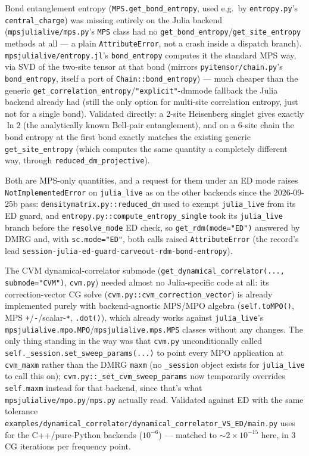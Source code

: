 \documentclass[11pt]{article}
\begin{document}
Bond entanglement entropy (\texttt{MPS.get\_bond\_entropy}, used e.g.\ by
\texttt{entropy.py}'s \texttt{central\_charge}) was missing entirely on
the Julia backend (\texttt{mpsjulialive/mps.py}'s \texttt{MPS} class had
no \texttt{get\_bond\_entropy}/\texttt{get\_site\_entropy} methods at
all --- a plain \texttt{AttributeError}, not a crash inside a dispatch
branch). \texttt{mpsjulialive/entropy.jl}'s \texttt{bond\_entropy}
computes it the standard MPS way, via SVD of the two-site tensor at that
bond (mirrors \texttt{pyitensor/chain.py}'s \texttt{bond\_entropy},
itself a port of \texttt{Chain::bond\_entropy}) --- much cheaper than
the generic \texttt{get\_correlation\_entropy}/\texttt{"explicit"}-dmmode
fallback the Julia backend already had (still the only option for
multi-site correlation entropy, just not for a single bond). Validated
directly: a 2-site Heisenberg singlet gives exactly $\ln 2$ (the
analytically known Bell-pair entanglement), and on a 6-site chain the
bond entropy at the first bond exactly matches the existing generic
\texttt{get\_site\_entropy} (which computes the same quantity a
completely different way, through \texttt{reduced\_dm\_projective}).

Both are MPS-only quantities, and a request for them under an ED mode
raises \texttt{NotImplementedError} on \texttt{julia\_live} as on the other
backends since the 2026-09-25b pass: \texttt{densitymatrix.py::reduced\_dm}
used to exempt \texttt{julia\_live} from its ED guard, and
\texttt{entropy.py::compute\_entropy\_single} took its \texttt{julia\_live}
branch before the \texttt{resolve\_mode} ED check, so
\texttt{get\_rdm(mode="ED")} answered by DMRG and, with
\texttt{sc.mode="ED"}, both calls raised \texttt{AttributeError} (the
record's lead
\texttt{session-\allowbreak julia-\allowbreak ed-\allowbreak guard-\allowbreak carveout-\allowbreak rdm-\allowbreak bond-\allowbreak entropy}).

The CVM dynamical-correlator submode
(\texttt{get\_dynamical\_correlator(..., submode="CVM")},
\texttt{cvm.py}) needed almost no Julia-specific code at all: its
correction-vector CG solve (\texttt{cvm.py::cvm\_correction\_vector}) is
already implemented purely with backend-agnostic MPS/MPO algebra
(\texttt{self.toMPO()}, MPS \texttt{+}/\texttt{-}/scalar-\texttt{*},
\texttt{.dot()}), which already works against \texttt{julia\_live}'s
\texttt{mpsjulialive.mpo.MPO}/\texttt{mpsjulialive.mps.MPS} classes
without any changes. The only thing standing in the way was that
\texttt{cvm.py} unconditionally called
\texttt{self.\_session.set\_sweep\_params(...)} to point every MPO
application at \texttt{cvm\_maxm} rather than the DMRG \texttt{maxm} (no
\texttt{\_session} object exists for \texttt{julia\_live} to call this
on); \texttt{cvm.py::\_set\_cvm\_sweep\_params} now temporarily
overrides \texttt{self.maxm} instead for that backend, since that's what
\texttt{mpsjulialive/mpo.py}/\texttt{mps.py} actually read. Validated
against ED with the same tolerance
\texttt{examples/dynamical\_correlator/dynamical\_correlator\_VS\_ED/main.py} uses for the
C++/pure-Python backends ($10^{-6}$) --- matched to
$\sim 2 \times 10^{-15}$ here, in 3 CG iterations per frequency point.
\end{document}
